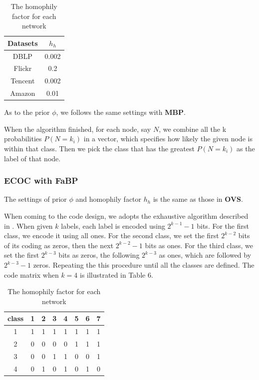 \begin{table}[!ht]
\centering
\begin{tabular}{c|c}
\toprule
\textbf{Datasets} & \textbf{$h_h$}\\
\midrule
DBLP & 0.002\\
Flickr & 0.2\\
Tencent & 0.002\\
Amazon & 0.01\\
\bottomrule
\end{tabular}
\caption{The homophily factor for each network}
\end{table} 

As to the prior $\phi$, we follows the same settings with \textbf{MBP}.

When the algorithm finished, for each node, say $N$, we combine all the k probabilities $P(N=k_i)$ in a vector, which specifies how likely the given node is within that class. Then we pick the class that has the greatest $P(N=k_i)$ as the label of that node.

\subsubsection*{ECOC with \textbf{FaBP}}
The settings of prior $\phi$ and homophily factor $h_h$ is the same as those in \textbf{OVS}.

When coming to the code design, we adopts the exhaustive algorithm described in \cite{Thomas1995}. When given $k$ labels, each label is encoded using $2^{k-1}-1$ bits. For the first class, we encode it using all ones. For the second class, we set the first $2^{k-2}$ bits of its coding as zeros, then the next $2^{k-2}-1$ bits as ones. For the third class, we set the first $2^{k-3}$ bits as zeros, the following $2^{k-3}$ as ones, which are followed by $2^{k-3}-1$ zeros. Repeating the this procedure until all the classes are defined. The code matrix when $k=4$ is illustrated in Table 6.

\begin{table}[!ht]
\centering
\begin{tabular}{c|ccccccc}
\toprule
\textbf{class} & 1 & 2 & 3 & 4 & 5 & 6 & 7\\
\midrule
1 & 1 & 1 & 1 & 1 & 1 & 1 & 1\\
2 & 0 & 0 & 0 & 0 & 1 & 1 & 1\\
3 & 0 & 0 & 1 & 1 & 0 & 0 & 1\\
4 & 0 & 1 & 0 & 1 & 0 & 1 & 0\\
\bottomrule
\end{tabular}
\caption{The homophily factor for each network}
\end{table} 








